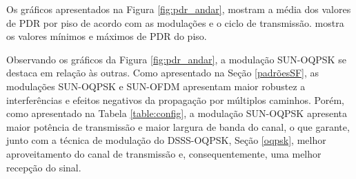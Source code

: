
Os gráficos apresentados na Figura \ref{fig:pdr_andar}, mostram a média dos valores de PDR por piso de acordo com as modulações e o ciclo de transmissão.  mostra os valores mínimos e máximos de PDR do piso.

Observando os gráficos da Figura \ref{fig:pdr_andar}, a modulação SUN-OQPSK se destaca em relação às outras. Como apresentado na Seção \ref{padrõesSF}, as modulações SUN-OQPSK e SUN-OFDM apresentam maior robustez a interferências e efeitos negativos da propagação por múltiplos caminhos. Porém, como apresentado na Tabela \ref{table:config}, a modulação SUN-OQPSK apresenta maior potência de transmissão e maior largura de banda do canal, o que garante, junto com a técnica de modulação do DSSS-OQPSK, Seção \ref{oqpsk}, melhor aproveitamento do canal de transmissão e, consequentemente, uma melhor recepção do sinal.


